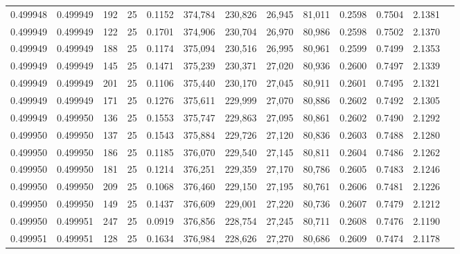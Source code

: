 \begin{tabular}{rrrrrrrrrrrrr}
0.499948 & 0.499949 &   192 &  25 &                                     0.1152 & 374,784 & 230,826 &  26,945 &  81,011 & 0.2598 & 0.7504 & 2.1381 \\
0.499949 & 0.499949 &   122 &  25 &                                     0.1701 & 374,906 & 230,704 &  26,970 &  80,986 & 0.2598 & 0.7502 & 2.1370 \\
0.499949 & 0.499949 &   188 &  25 &                                     0.1174 & 375,094 & 230,516 &  26,995 &  80,961 & 0.2599 & 0.7499 & 2.1353 \\
0.499949 & 0.499949 &   145 &  25 &                                     0.1471 & 375,239 & 230,371 &  27,020 &  80,936 & 0.2600 & 0.7497 & 2.1339 \\
0.499949 & 0.499949 &   201 &  25 &                                     0.1106 & 375,440 & 230,170 &  27,045 &  80,911 & 0.2601 & 0.7495 & 2.1321 \\
0.499949 & 0.499949 &   171 &  25 &                                     0.1276 & 375,611 & 229,999 &  27,070 &  80,886 & 0.2602 & 0.7492 & 2.1305 \\
0.499949 & 0.499950 &   136 &  25 &                                     0.1553 & 375,747 & 229,863 &  27,095 &  80,861 & 0.2602 & 0.7490 & 2.1292 \\
0.499950 & 0.499950 &   137 &  25 &                                     0.1543 & 375,884 & 229,726 &  27,120 &  80,836 & 0.2603 & 0.7488 & 2.1280 \\
0.499950 & 0.499950 &   186 &  25 &                                     0.1185 & 376,070 & 229,540 &  27,145 &  80,811 & 0.2604 & 0.7486 & 2.1262 \\
0.499950 & 0.499950 &   181 &  25 &                                     0.1214 & 376,251 & 229,359 &  27,170 &  80,786 & 0.2605 & 0.7483 & 2.1246 \\
0.499950 & 0.499950 &   209 &  25 &                                     0.1068 & 376,460 & 229,150 &  27,195 &  80,761 & 0.2606 & 0.7481 & 2.1226 \\
0.499950 & 0.499950 &   149 &  25 &                                     0.1437 & 376,609 & 229,001 &  27,220 &  80,736 & 0.2607 & 0.7479 & 2.1212 \\
0.499950 & 0.499951 &   247 &  25 &                                     0.0919 & 376,856 & 228,754 &  27,245 &  80,711 & 0.2608 & 0.7476 & 2.1190 \\
0.499951 & 0.499951 &   128 &  25 &                                     0.1634 & 376,984 & 228,626 &  27,270 &  80,686 & 0.2609 & 0.7474 & 2.1178 \\

\end{tabular}
